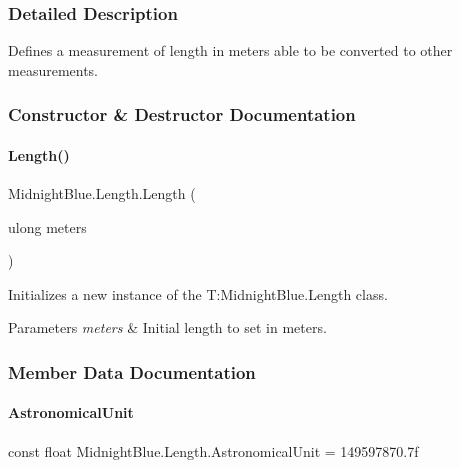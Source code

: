 \subsubsection{Detailed Description}
Defines a measurement of length in meters able to be converted to other measurements. 



\subsubsection{Constructor \& Destructor Documentation}
\hypertarget{class_midnight_blue_1_1_length_a8c58b161c6f730c22d84b01b078bd091}{}\label{class_midnight_blue_1_1_length_a8c58b161c6f730c22d84b01b078bd091} 
\paragraph{\texorpdfstring{Length()}{Length()}}
{\footnotesize\ttfamily Midnight\+Blue.\+Length.\+Length (\begin{DoxyParamCaption}\item[{ulong}]{meters }\end{DoxyParamCaption})\hspace{0.3cm}{\ttfamily [inline]}}



Initializes a new instance of the T\+:\+Midnight\+Blue.\+Length class. 


\begin{DoxyParams}{Parameters}
{\em meters} & Initial length to set in meters.\\
\hline
\end{DoxyParams}


\subsubsection{Member Data Documentation}
\hypertarget{class_midnight_blue_1_1_length_a5e86fa7e1d296ca9e6c5406a863427a6}{}\label{class_midnight_blue_1_1_length_a5e86fa7e1d296ca9e6c5406a863427a6} 
\paragraph{\texorpdfstring{Astronomical\+Unit}{AstronomicalUnit}}
{\footnotesize\ttfamily const float Midnight\+Blue.\+Length.\+Astronomical\+Unit = 149597870.\+7f}



